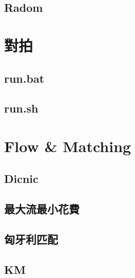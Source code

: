 \subsection{Radom}


\section{對拍}

\subsection{run.bat}


\subsection{run.sh}

\section{Flow \& Matching}

\subsection{Dicnic}


\subsection{最大流最小花費}


\subsection{匈牙利匹配}


\subsection{KM}


